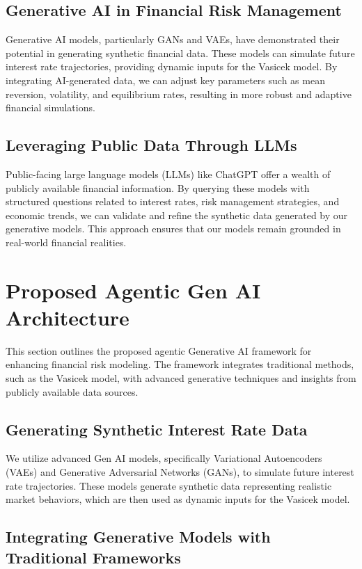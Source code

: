 \documentclass[a4paper,headinclude=on,footinclude=on,12pt,oneside]{scrbook}
\begin{document}
\subsection{Generative AI in Financial Risk Management}

Generative AI models, particularly GANs and VAEs, have demonstrated their potential in generating synthetic financial data. These models can simulate future interest rate trajectories, providing dynamic inputs for the Vasicek model. By integrating AI-generated data, we can adjust key parameters such as mean reversion, volatility, and equilibrium rates, resulting in more robust and adaptive financial simulations.

\subsection{Leveraging Public Data Through LLMs}

Public-facing large language models (LLMs) like ChatGPT offer a wealth of publicly available financial information. By querying these models with structured questions related to interest rates, risk management strategies, and economic trends, we can validate and refine the synthetic data generated by our generative models. This approach ensures that our models remain grounded in real-world financial realities.

\section{Proposed Agentic Gen AI Architecture}

This section outlines the proposed agentic Generative AI framework for enhancing financial risk modeling. The framework integrates traditional methods, such as the Vasicek model, with advanced generative techniques and insights from publicly available data sources.

\subsection{Generating Synthetic Interest Rate Data}

We utilize advanced Gen AI models, specifically Variational Autoencoders (VAEs) and Generative Adversarial Networks (GANs), to simulate future interest rate trajectories. These models generate synthetic data representing realistic market behaviors, which are then used as dynamic inputs for the Vasicek model.

\subsection{Integrating Generative Models with Traditional Frameworks}
\end{document}
